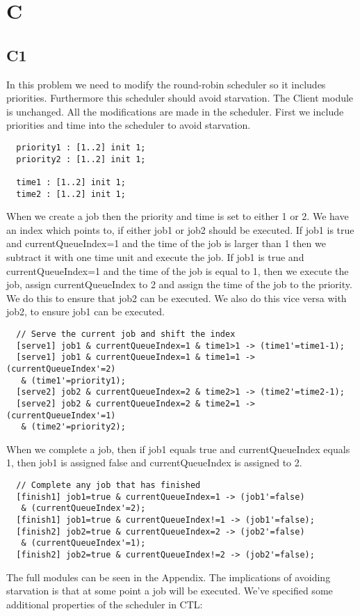 \section{C}

\subsection{C1}

In this problem we need to modify the round-robin scheduler so it includes priorities. Furthermore
this scheduler should avoid starvation.
The Client module is unchanged. All the modifications are made in the scheduler.
First we include priorities and time into the scheduler to avoid starvation.
\begin{verbatim}
  priority1 : [1..2] init 1;
  priority2 : [1..2] init 1;

  time1 : [1..2] init 1;
  time2 : [1..2] init 1;
\end{verbatim}

When we create a job then the priority and time is set to either 1 or 2.
We have an index which points to, if either job1 or job2 should be executed.
If job1 is true and currentQueueIndex=1 and the time of the job is larger than 1 then we
subtract it with one time unit and execute the job.
If job1 is true and currentQueueIndex=1 and the time of the job is equal to 1, then we execute the job, 
assign currentQueueIndex to 2 and assign the time of the job to the priority.
We do this to ensure that job2 can be executed. We also do this vice versa with job2,
to ensure job1 can be executed.
\begin{verbatim}
  // Serve the current job and shift the index
  [serve1] job1 & currentQueueIndex=1 & time1>1 -> (time1'=time1-1);
  [serve1] job1 & currentQueueIndex=1 & time1=1 -> (currentQueueIndex'=2)
   & (time1'=priority1);
  [serve2] job2 & currentQueueIndex=2 & time2>1 -> (time2'=time2-1);
  [serve2] job2 & currentQueueIndex=2 & time2=1 -> (currentQueueIndex'=1)
   & (time2'=priority2);
\end{verbatim}
When we complete a job, then if job1 equals true and currentQueueIndex equals 1, then 
job1 is assigned false and currentQueueIndex is assigned to 2.
\begin{verbatim}
  // Complete any job that has finished
  [finish1] job1=true & currentQueueIndex=1 -> (job1'=false)
   & (currentQueueIndex'=2);
  [finish1] job1=true & currentQueueIndex!=1 -> (job1'=false);
  [finish2] job2=true & currentQueueIndex=2 -> (job2'=false)
   & (currentQueueIndex'=1);
  [finish2] job2=true & currentQueueIndex!=2 -> (job2'=false);
\end{verbatim}
The full modules can be seen in the Appendix.
The implications of avoiding starvation is that at some point a job will be executed.
We've specified some additional properties of the scheduler in CTL:

